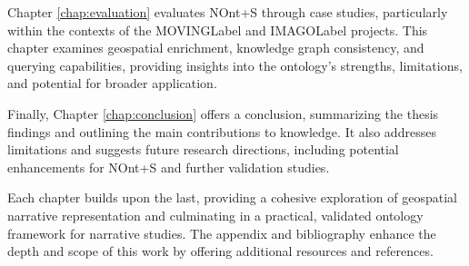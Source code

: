 Chapter \ref{chap:evaluation} evaluates NOnt+S through case studies, particularly within the contexts of the \acrfull{MOVINGLabel}\cite{MOVINGHorizon2020} and \acrfull{IMAGOLabel}\cite{IMAGOProject} projects. This chapter examines geospatial enrichment, knowledge graph consistency, and querying capabilities, providing insights into the ontology’s strengths, limitations, and potential for broader application.


Finally, Chapter \ref{chap:conclusion} offers a conclusion, summarizing the thesis findings and outlining the main contributions to knowledge. It also addresses limitations and suggests future research directions, including potential enhancements for NOnt+S and further validation studies.

Each chapter builds upon the last, providing a cohesive exploration of geospatial narrative representation and culminating in a practical, validated ontology framework for narrative studies. The appendix and bibliography enhance the depth and scope of this work by offering additional resources and references.
